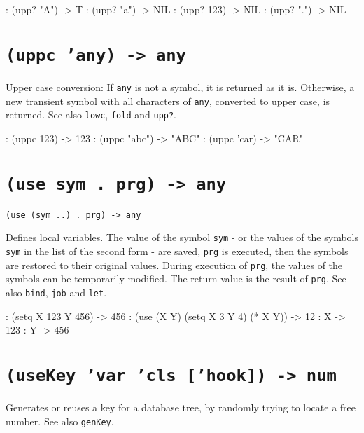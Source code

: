 \begin{wideverbatim}
: (upp? "A")
-> T
: (upp? "a")
-> NIL
: (upp? 123)
-> NIL
: (upp? ".")
-> NIL
\end{wideverbatim}

 
\section*{\texttt{(uppc 'any) -> any}}
\label{sec:func-ref-U-(uppc 'any) -> any}


Upper case conversion: If \texttt{any} is not a symbol, it is returned as it
is. Otherwise, a new transient symbol with all characters of \texttt{any},
converted to upper case, is returned. See also \texttt{lowc}, \texttt{fold} and
\texttt{upp?}.


\begin{wideverbatim}
: (uppc 123)
-> 123
: (uppc "abc")
-> "ABC"
: (uppc 'car)
-> "CAR"
\end{wideverbatim}

 
\section*{\texttt{(use sym . prg) -> any}}
\label{sec:func-ref-U-(use sym . prg) -> any}


\texttt{(use (sym ..) . prg) -> any}

Defines local variables. The value of the symbol \texttt{sym} - or the values
of the symbols \texttt{sym} in the list of the second form - are saved, \texttt{prg}
is executed, then the symbols are restored to their original values.
During execution of \texttt{prg}, the values of the symbols can be temporarily
modified. The return value is the result of \texttt{prg}. See also \texttt{bind},
\texttt{job} and \texttt{let}.


\begin{wideverbatim}
: (setq  X 123  Y 456)
-> 456
: (use (X Y) (setq  X 3  Y 4) (* X Y))
-> 12
: X
-> 123
: Y
-> 456
\end{wideverbatim}

 
\section*{\texttt{(useKey 'var 'cls ['hook]) -> num}}
\label{sec:func-ref-U-(useKey 'var 'cls ['hook]) -> num}


Generates or reuses a key for a database tree, by randomly trying to
locate a free number. See also \texttt{genKey}.


